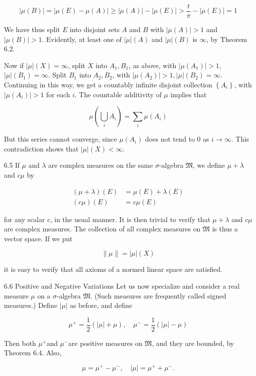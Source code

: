 \documentclass[10pt]{article}
\begin{document}
$$
|\mu(B)|=|\mu(E)-\mu(A)| \geq|\mu(A)|-|\mu(E)|>\frac{t}{\pi}-|\mu(E)|=1
$$

We have thus split $E$ into disjoint sets $A$ and $B$ with $|\mu(A)|>1$ and $|\mu(B)|>1$. Evidently, at least one of $|\mu|(A)$ and $|\mu|(B)$ is $\infty$, by Theorem 6.2.

Now if $|\mu|(X)=\infty$, split $X$ into $A_{1}, B_{1}$, as above, with $\left|\mu\left(A_{1}\right)\right|>1$, $|\mu|\left(B_{1}\right)=\infty$. Split $B_{1}$ into $A_{2}, B_{2}$, with $\left|\mu\left(A_{2}\right)\right|>1,|\mu|\left(B_{2}\right)=\infty$. Continuing in this way, we get a countably infinite disjoint collection $\left\{A_{i}\right\}$, with $\left|\mu\left(A_{i}\right)\right|>1$ for each $i$. The countable additivity of $\mu$ implies that

$$
\mu\left(\bigcup_{i} A_{i}\right)=\sum_{i} \mu\left(A_{i}\right)
$$

But this series cannot converge, since $\mu\left(A_{i}\right)$ does not tend to 0 as $i \rightarrow \infty$. This contradiction shows that $|\mu|(X)<\infty$.

6.5 If $\mu$ and $\lambda$ are complex measures on the same $\sigma$-algebra $\mathfrak{M}$, we define $\mu+\lambda$ and $c \mu$ by

$$
\begin{aligned}
(\mu+\lambda)(E) & =\mu(E)+\lambda(E) \\
(c \mu)(E) & =c \mu(E)
\end{aligned}
$$

for any scalar $c$, in the usual manner. It is then trivial to verify that $\mu+\lambda$ and $c \mu$ are complex measures. The collection of all complex measures on $\mathfrak{M}$ is thus a vector space. If we put

$$
\|\mu\|=|\mu|(X)
$$

it is easy to verify that all axioms of a normed linear space are satisfied.

6.6 Positive and Negative Variations Let us now specialize and consider a real measure $\mu$ on a $\sigma$-algebra $\mathfrak{M}$. (Such measures are frequently called signed measures.) Define $|\mu|$ as before, and define

$$
\mu^{+}=\frac{1}{2}(|\mu|+\mu), \quad \mu^{-}=\frac{1}{2}(|\mu|-\mu)
$$

Then both $\mu^{+}$and $\mu^{-}$are positive measures on $\mathfrak{M}$, and they are bounded, by Theorem 6.4. Also,

$$
\mu=\mu^{+}-\mu^{-}, \quad|\mu|=\mu^{+}+\mu^{-} .
$$
\end{document}
